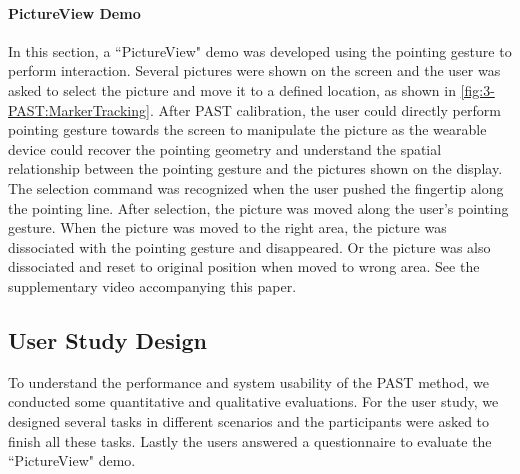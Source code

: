 \paragraph{PictureView Demo} \label{sec:3-PAST:pictureviewDemo}
In this section, a ``PictureView" demo was developed using the pointing gesture to perform interaction. Several pictures were shown on the screen and the user was asked to select the picture and move it to a defined location, as shown in \figurename{ \ref{fig:3-PAST:MarkerTracking}}. After PAST calibration, the user could directly perform pointing gesture towards the screen to manipulate the picture as the wearable device could recover the pointing geometry and understand the spatial relationship between the pointing gesture and the pictures shown on the display. The selection command was recognized when the user pushed the fingertip along the pointing line. After selection, the picture was moved along the user's pointing gesture. When the picture was moved to the right area, the picture was dissociated with the pointing gesture and disappeared. Or the picture was also dissociated and reset to original position when moved to wrong area. See the supplementary video accompanying this paper.

\subsection{User Study Design}
To understand the performance and system usability of the PAST method, we conducted some quantitative and qualitative evaluations. For the user study, we designed several tasks in different scenarios and the participants were asked to finish all these tasks. Lastly the users answered a questionnaire to evaluate the ``PictureView" demo.
